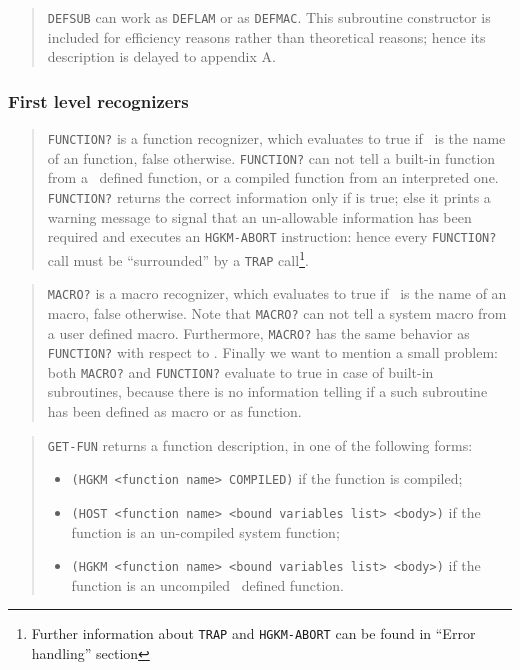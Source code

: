 \begin{quote}
	{\tt DEFSUB} can work as {\tt DEFLAM} or as {\tt DEFMAC}.
	This subroutine constructor is included for efficiency reasons rather than
	theoretical reasons; hence its description is delayed to appendix A.
\end{quote}


\subsubsection{First level recognizers}

\begin{quote}
	{\tt FUNCTION?} is a function recognizer, which evaluates to true if \obj\
	is the name of an {\HG} function, false otherwise. 
	{\tt FUNCTION?} can not tell a built-in function from a \flconst\ defined
	function, or a compiled function from an interpreted one.
	{\tt FUNCTION?} returns the correct information only if {\tt\infmode} is
	true; else it prints a warning message to signal that an un-allowable
	information has been required and executes an {\tt HGKM-ABORT} instruction: hence
	every {\tt FUNCTION?} call must be ``surrounded'' by a {\tt TRAP}
	call\footnote{Further information about {\tt TRAP} and {\tt HGKM-ABORT} can be
	found in ``Error handling'' section}.
\end{quote}

\begin{quote}
	{\tt MACRO?} is a macro recognizer, which evaluates to true if \obj\ is the
	name of an {\HG} macro, false otherwise.
	Note that {\tt MACRO?} can not tell a system macro from a user defined
	macro.
	Furthermore, {\tt MACRO?} has the same behavior as {\tt FUNCTION?} with
	respect to {\tt\infmode}.
	Finally we want to mention a small problem: both {\tt MACRO?} and
	{\tt FUNCTION?} evaluate to true in case of built-in subroutines, because
	there is no information telling if a such subroutine has been defined as
	macro or as function.
\end{quote}

\begin{quote}
	{\tt GET-FUN} returns a function description, in one of the following forms:
	\begin{itemize}
		\item
			{\tt (HGKM <function name> COMPILED)} if the \newline function is
			compiled; 
		\item
			{\tt (HOST <function name> <bound variables list> <body>)} if the
			\newline function is an un-compiled system function;
		\item
			{\tt (HGKM <function name> <bound variables list> <body>)} if the
			\newline function is an uncompiled \flconst\ defined function.
	\end{itemize}
\end{quote}


